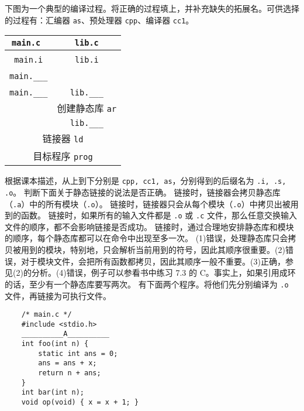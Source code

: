     \begin{problems}
        \pro 下图为一个典型的编译过程。将正确的过程填上，并补充缺失的拓展名。可供选择的过程有：汇编器 \verb|as|、预处理器 \verb|cpp|、编译器 \verb|cc1|。
        \begin{table}[H]
            \centering
            \begin{tabular}{cc}
                \texttt{\qquad \qquad main.c \qquad \qquad} & \texttt{\qquad \qquad \ lib.c \qquad \qquad} \\ \hline
                \multicolumn{1}{|c|}{} & \multicolumn{1}{c|}{} \\ \hline
                \texttt{main.i} & \texttt{lib.i} \\ \hline
                \multicolumn{1}{|c|}{} & \multicolumn{1}{c|}{} \\ \hline
                \verb|main.___| &  \\ \hline
                \multicolumn{1}{|c|}{} & \multicolumn{1}{c|}{} \\ \hline
                \verb|main.___| & \verb|lib.___| \\ \cline{2-2} 
                \multicolumn{1}{c|}{} & \multicolumn{1}{c|}{创建静态库 \texttt{ar}} \\ \cline{2-2} 
                & \verb|lib.___| \\ \hline
                \multicolumn{2}{|c|}{链接器 \texttt{ld}} \\ \hline
                \multicolumn{2}{c}{目标程序 \texttt{prog}}
            \end{tabular}
        \end{table}
        \sol 根据课本描述，从上到下分别是 \verb|cpp, cc1, as|，分别得到的后缀名为 \verb|.i, .s, .o|。
        \pro 判断下面关于静态链接的说法是否正确。
            \qn 链接时，链接器会拷贝静态库（\verb|.a|）中的所有模块（\verb|.o|）。
            \qn 链接时，链接器只会从每个模块（\verb|.o|）中拷贝出被用到的函数。
            \qn 链接时，如果所有的输入文件都是 \verb|.o| 或 \verb|.c| 文件，那么任意交换输入文件的顺序，都不会影响链接是否成功。
            \qn 链接时，通过合理地安排静态库和模块的顺序，每个静态库都可以在命令中出现至多一次。
        \sol (1)错误，处理静态库只会拷贝被用到的模块，特别地，只会解析当前用到的符号，因此其顺序很重要。(2)错误，对于模块文件，会把所有函数都拷贝，因此其顺序一般不重要。(3)正确，参见(2)的分析。(4)错误，例子可以参看书中练习 7.3 的 C。事实上，如果引用成环的话，至少有一个静态库要写两次。
        \pro 有下面两个程序。将他们先分别编译为 \verb|.o| 文件，再链接为可执行文件。
        \begin{verbatim}
    /* main.c */
    #include <stdio.h>
    __________A__________
    int foo(int n) {
        static int ans = 0;
        ans = ans + x;
        return n + ans;
    }
    int bar(int n);
    void op(void) { x = x + 1; }


\end{verbatim}
\end{problems}
